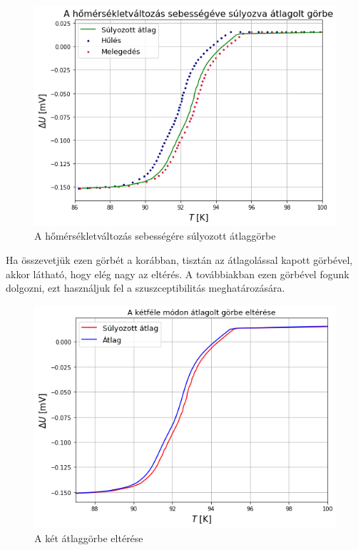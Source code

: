 \documentclass[12pt,a4paper]{article}
\begin{document}
\newpage
\begin{figure}[!h]
\centering
\hspace*{-1cm}
\includegraphics[scale=0.65]{sulyozott}
\caption{A hőmérsékletváltozás sebességére súlyozott átlaggörbe}
\label{fig:5}
\end{figure}
Ha összevetjük ezen görbét a korábban, tisztán az átlagolással kapott görbével, akkor látható, hogy elég nagy az eltérés. A továbbiakban ezen görbével fogunk dolgozni, ezt használjuk fel a szuszceptibilitás meghatározására.
\begin{figure}[!h]
\centering
\hspace*{-1cm}
\includegraphics[scale=0.65]{elteres}
\caption{A két átlaggörbe eltérése}
\label{fig:6}
\end{figure}
\end{document}
